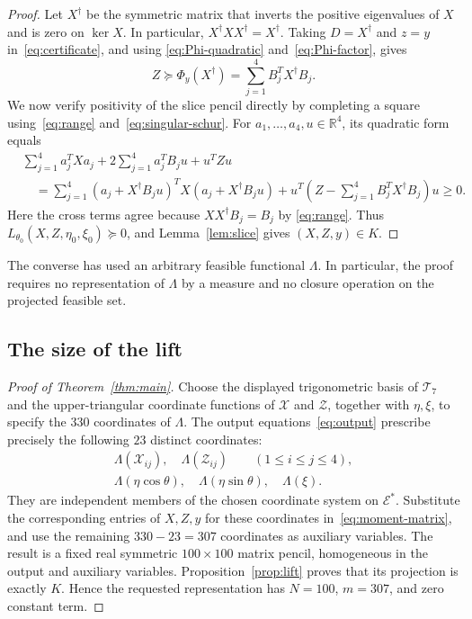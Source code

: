 \begin{proof}
Let $X^\dagger$ be the symmetric matrix that inverts the positive
eigenvalues of $X$ and is zero on $\ker X$.  In particular,
$X^\dagger XX^\dagger=X^\dagger$.
Taking $D=X^\dagger$ and $z=y$ in~\eqref{eq:certificate}, and using
\eqref{eq:Phi-quadratic} and~\eqref{eq:Phi-factor}, gives
\begin{equation}\label{eq:singular-schur}
  Z\succeq\Phi_y(X^\dagger)
    =\sum_{j=1}^4B_j^TX^\dagger B_j.
\end{equation}
We now verify positivity of the slice pencil directly by completing
a square using~\eqref{eq:range} and~\eqref{eq:singular-schur}.  For
$a_1,\ldots,a_4,u\in\mathbb R^4$, its quadratic form equals
\begin{align*}
  &\sum_{j=1}^4a_j^TXa_j
    +2\sum_{j=1}^4a_j^TB_ju+u^TZu\\
  &\quad=\sum_{j=1}^4
    (a_j+X^\dagger B_ju)^TX(a_j+X^\dagger B_ju)
    +u^T\left(Z-\sum_{j=1}^4B_j^TX^\dagger B_j\right)u
    \geq0.
\end{align*}
Here the cross terms agree because $XX^\dagger B_j=B_j$ by
\eqref{eq:range}.  Thus
$L_{\theta_0}(X,Z,\eta_0,\xi_0)\succeq0$, and
Lemma~\ref{lem:slice} gives $(X,Z,y)\in K$.
\end{proof}

The converse has used an arbitrary feasible functional $\Lambda$.
In particular, the proof requires no representation of $\Lambda$ by a
measure and no closure operation on the projected feasible set.

\subsection{The size of the lift}

\begin{proof}[Proof of Theorem~\ref{thm:main}]
Choose the displayed trigonometric basis of $\mathcal T_7$ and the
upper-triangular coordinate functions of $\mathcal X$ and $\mathcal Z$,
together with $\eta,\xi$, to specify the $330$ coordinates of $\Lambda$.
The output equations~\eqref{eq:output} prescribe precisely the following
$23$ distinct coordinates:
\begin{gather*}
  \Lambda(\mathcal X_{ij}),\quad
  \Lambda(\mathcal Z_{ij})\qquad(1\leq i\leq j\leq4),\\
  \Lambda(\eta\cos\theta),\quad
  \Lambda(\eta\sin\theta),\quad
  \Lambda(\xi).
\end{gather*}
They are independent members of the chosen coordinate system on
$\mathcal E^*$.  Substitute the corresponding entries of $X,Z,y$ for
these coordinates in~\eqref{eq:moment-matrix}, and use the remaining
$330-23=307$ coordinates as auxiliary variables.  The result is a fixed
real symmetric $100\times100$ matrix pencil, homogeneous in the output
and auxiliary variables.  Proposition~\ref{prop:lift} proves that its
projection is exactly $K$.  Hence the requested representation has
$N=100$, $m=307$, and zero constant term.
\end{proof}

